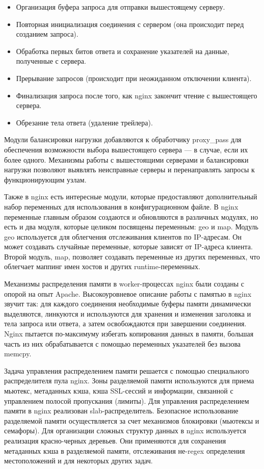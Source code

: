 \documentclass[14pt, a4paper]{article}
\begin{document}
\begin{itemize}
    \item Организация буфера запроса для отправки вышестоящему серверу.
    \item Повторная инициализация соединения с сервером (она происходит перед созданием запроса).
    \item Обработка первых битов ответа и сохранение указателей на данные, полученные с сервера.
    \item Прерывание запросов (происходит при неожиданном отключении клиента).
    \item Финализация запроса после того, как nginx закончит чтение с вышестоящего сервера.
    \item Обрезание тела ответа (удаление трейлера).
\end{itemize}
Модули балансировки нагрузки добавляются к обработчику proxy\_pass для обеспечения возможности 
выбора вышестоящего сервера — в случае, если их более одного. Механизмы работы с вышестоящими 
серверами и балансировки нагрузки позволяют выявлять неисправные серверы и перенаправлять запросы
к функционирующим узлам.

Также в nginx есть интересные модули, которые предоставляют дополнительный набор переменных для 
использования в конфигурационном файле. В nginx переменные главным образом создаются и обновляются 
в различных модулях, но есть и два модуля, которые целиком посвящены переменным: geo и map. Модуль 
geo используется для облегчения отслеживания клиентов по IP-адресам. Он может создавать случайные 
переменные, которые зависят от IP-адреса клиента. Второй модуль, map, позволяет создавать переменные 
из других переменных, что облегчает маппинг имен хостов и других runtime-переменных.

Механизмы распределения памяти в worker-процессах nginx были созданы с опорой на опыт Apache. 
Высокоуровневое описание работы с памятью в nginx звучит так: для каждого соединения необходимые 
буферы памяти динамически выделяются, линкуются и используются для хранения и изменения заголовка 
и тела запроса или ответа, а затем освобождаются при завершении соединения. Nginx пытается 
по-максимуму избегать копирования данных в памяти, большая часть из них обрабатывается с 
помощью переменных указателей без вызова memcpy.

Задача управления распределением памяти решается с помощью специального распределителя пула 
nginx. Зоны разделяемой памяти используются для приема мьютекс, метаданных кэша, кэша SSL-сессий 
и информации, связанной с управлением полосой пропускания (лимиты). Для управления распределением 
памяти в nginx реализован slab-распределитель. Безопасное использование разделяемой памяти 
осуществляется за счет механизмов блокировки (мьютексы и семафоры). Для организации сложных 
структур данных в nginx используется реализация красно-черных деревьев. Они применяются для 
сохранения метаданных кэша в разделяемой памяти, отслеживания не-regex определения местоположений 
и для некоторых других задач.
\end{document}
